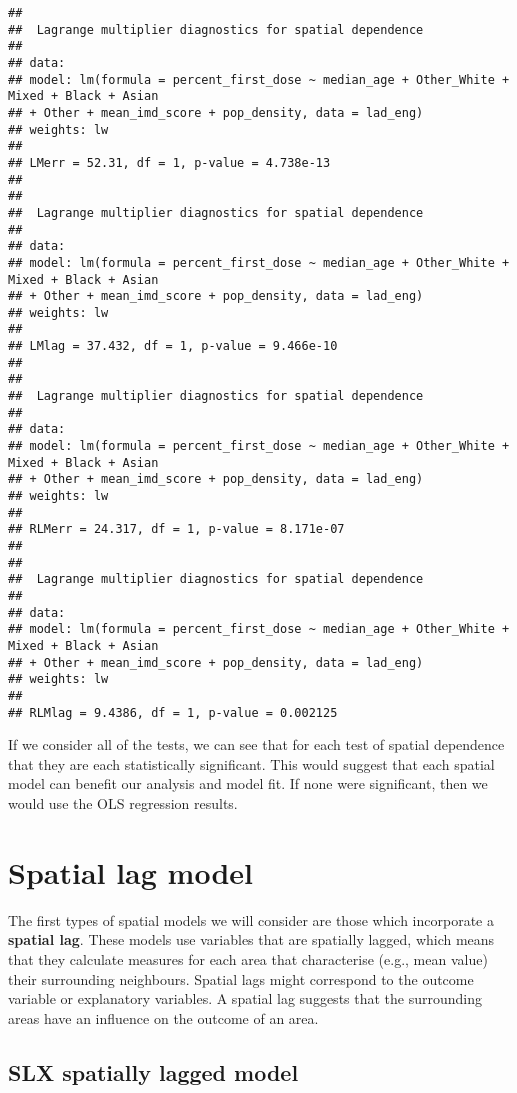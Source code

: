 \documentclass[
]{book}
\begin{document}
\begin{verbatim}
## 
##  Lagrange multiplier diagnostics for spatial dependence
## 
## data:  
## model: lm(formula = percent_first_dose ~ median_age + Other_White + Mixed + Black + Asian
## + Other + mean_imd_score + pop_density, data = lad_eng)
## weights: lw
## 
## LMerr = 52.31, df = 1, p-value = 4.738e-13
## 
## 
##  Lagrange multiplier diagnostics for spatial dependence
## 
## data:  
## model: lm(formula = percent_first_dose ~ median_age + Other_White + Mixed + Black + Asian
## + Other + mean_imd_score + pop_density, data = lad_eng)
## weights: lw
## 
## LMlag = 37.432, df = 1, p-value = 9.466e-10
## 
## 
##  Lagrange multiplier diagnostics for spatial dependence
## 
## data:  
## model: lm(formula = percent_first_dose ~ median_age + Other_White + Mixed + Black + Asian
## + Other + mean_imd_score + pop_density, data = lad_eng)
## weights: lw
## 
## RLMerr = 24.317, df = 1, p-value = 8.171e-07
## 
## 
##  Lagrange multiplier diagnostics for spatial dependence
## 
## data:  
## model: lm(formula = percent_first_dose ~ median_age + Other_White + Mixed + Black + Asian
## + Other + mean_imd_score + pop_density, data = lad_eng)
## weights: lw
## 
## RLMlag = 9.4386, df = 1, p-value = 0.002125
\end{verbatim}

If we consider all of the tests, we can see that for each test of spatial dependence that they are each statistically significant. This would suggest that each spatial model can benefit our analysis and model fit. If none were significant, then we would use the OLS regression results.

\hypertarget{spatial-lag-model}{%
\section{Spatial lag model}\label{spatial-lag-model}}

The first types of spatial models we will consider are those which incorporate a \textbf{spatial lag}. These models use variables that are spatially lagged, which means that they calculate measures for each area that characterise (e.g., mean value) their surrounding neighbours. Spatial lags might correspond to the outcome variable or explanatory variables. A spatial lag suggests that the surrounding areas have an influence on the outcome of an area.

\hypertarget{slx-spatially-lagged-model}{%
\subsection{SLX spatially lagged model}\label{slx-spatially-lagged-model}}
\end{document}

